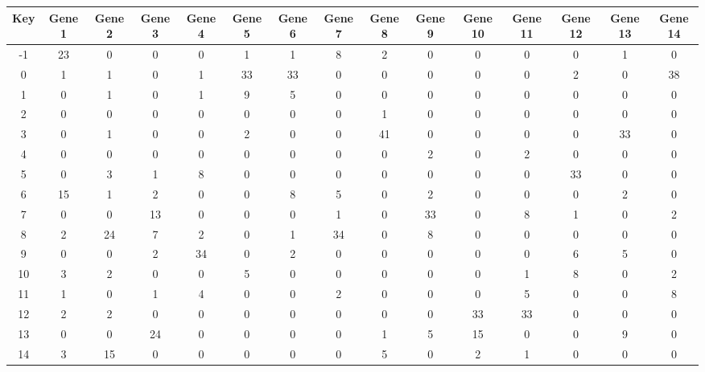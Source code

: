 \begin{tabular}{|c|c|c|c|c|c|c|c|c|c|c|c|c|c|c|}
\hline
Key & Gene 1 & Gene 2 & Gene 3 & Gene 4 & Gene 5 & Gene 6 & Gene 7 & Gene 8 & Gene 9 & Gene 10 & Gene 11 & Gene 12 & Gene 13 & Gene 14 \\
\hline
-1 & 23 & 0 & 0 & 0 & 1 & 1 & 8 & 2 & 0 & 0 & 0 & 0 & 1 & 0 \\
0 & 1 & 1 & 0 & 1 & 33 & 33 & 0 & 0 & 0 & 0 & 0 & 2 & 0 & 38 \\
1 & 0 & 1 & 0 & 1 & 9 & 5 & 0 & 0 & 0 & 0 & 0 & 0 & 0 & 0 \\
2 & 0 & 0 & 0 & 0 & 0 & 0 & 0 & 1 & 0 & 0 & 0 & 0 & 0 & 0 \\
3 & 0 & 1 & 0 & 0 & 2 & 0 & 0 & 41 & 0 & 0 & 0 & 0 & 33 & 0 \\
4 & 0 & 0 & 0 & 0 & 0 & 0 & 0 & 0 & 2 & 0 & 2 & 0 & 0 & 0 \\
5 & 0 & 3 & 1 & 8 & 0 & 0 & 0 & 0 & 0 & 0 & 0 & 33 & 0 & 0 \\
6 & 15 & 1 & 2 & 0 & 0 & 8 & 5 & 0 & 2 & 0 & 0 & 0 & 2 & 0 \\
7 & 0 & 0 & 13 & 0 & 0 & 0 & 1 & 0 & 33 & 0 & 8 & 1 & 0 & 2 \\
8 & 2 & 24 & 7 & 2 & 0 & 1 & 34 & 0 & 8 & 0 & 0 & 0 & 0 & 0 \\
9 & 0 & 0 & 2 & 34 & 0 & 2 & 0 & 0 & 0 & 0 & 0 & 6 & 5 & 0 \\
10 & 3 & 2 & 0 & 0 & 5 & 0 & 0 & 0 & 0 & 0 & 1 & 8 & 0 & 2 \\
11 & 1 & 0 & 1 & 4 & 0 & 0 & 2 & 0 & 0 & 0 & 5 & 0 & 0 & 8 \\
12 & 2 & 2 & 0 & 0 & 0 & 0 & 0 & 0 & 0 & 33 & 33 & 0 & 0 & 0 \\
13 & 0 & 0 & 24 & 0 & 0 & 0 & 0 & 1 & 5 & 15 & 0 & 0 & 9 & 0 \\
14 & 3 & 15 & 0 & 0 & 0 & 0 & 0 & 5 & 0 & 2 & 1 & 0 & 0 & 0 \\
\hline
\end{tabular}